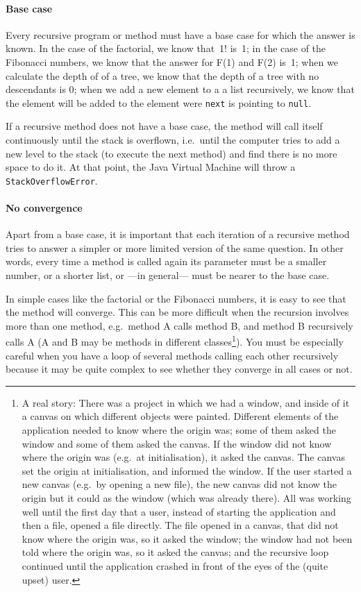 \paragraph{Base case}
\label{sec:base-case}

Every recursive program or method must have a base case for which the
answer is known. In the case of the factorial, we know that~1! is~1;
in the case of the Fibonacci numbers, we know 
that the answer for F(1) and F(2) is~1; when we calculate the depth of
of a tree, we know that the depth of a tree with no descendants is 0;
when we add a new element to a a list recursively, we know that the
element will be added to the element were \verb+next+ is pointing to
\verb+null+. 

If a recursive method does not have a base case, the method will call
itself continuously until the stack is overflown, i.e.~until the
computer tries to add a new level to the stack (to execute the next
method) and find there is no more space to do it. At that point, the
Java Virtual Machine will throw a \verb+StackOverflowError+. 

\paragraph{No convergence}
\label{sec:no-convergence}

Apart from a base case, it is important that each iteration of a
recursive method tries to answer a simpler or more limited version of
the same question. In other words, every time a method is called again
its parameter must be a smaller number, or a shorter list, or ---in
general--- must be nearer to the base case. 

In simple cases like the factorial or the Fibonacci numbers, it is
easy to see that the method will converge. This can be more difficult
when the recursion involves more than one method, e.g.~method A calls
method B, and method B recursively calls A (A and B may be methods in
different classes\footnote{A real story: There was a project in which
  we had a window, and inside of it a canvas on which different
  objects were painted. Different elements of the application needed
  to know where the origin was; some of them asked the window and some
  of them asked the canvas. If the window did not know where the
  origin was (e.g.~at initialisation), it asked the canvas. The canvas
  set the origin at initialisation, and informed the window. If the
  user started a new canvas (e.g.~by opening a new file), the new
  canvas did not know the origin but it could as the window (which was
  already there). All was working well until the first day that a
  user, instead of starting the application and then a file, opened a
  file directly. The file opened in a canvas, that did not know where
  the origin was, so it asked the window; the window had not been told
  where the origin was, so it asked the canvas; and the recursive loop
  continued until the application crashed in front of the eyes of the
  (quite upset) user.}). You must be especially careful when you have
a loop of several methods calling each other recursively because it
may be quite complex to see whether they converge in all cases or not.

